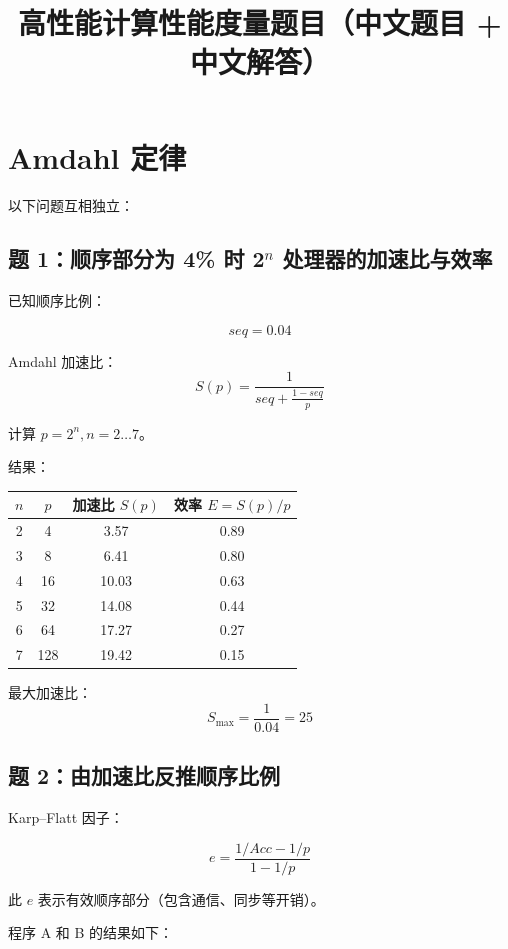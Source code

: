\documentclass[12pt]{article}
\title{高性能计算性能度量题目（中文题目 + 中文解答）}
\author{}
\date{}
\begin{document}
\maketitle

\section{Amdahl 定律}

以下问题互相独立：

\subsection{题 1：顺序部分为 4\% 时 2$^n$ 处理器的加速比与效率}

已知顺序比例：

\[
seq = 0.04
\]

Amdahl 加速比：
\[
S(p) = \frac{1}{seq + \frac{1-seq}{p}}
\]

计算 $p = 2^n, n=2\dots 7$。

结果：

\begin{center}
\begin{tabular}{c|c|c|c}
$n$ & $p$ & 加速比 $S(p)$ & 效率 $E=S(p)/p$ \\ \hline
2 & 4 & 3.57 & 0.89 \\
3 & 8 & 6.41 & 0.80 \\
4 & 16 & 10.03 & 0.63 \\
5 & 32 & 14.08 & 0.44 \\
6 & 64 & 17.27 & 0.27 \\
7 & 128 & 19.42 & 0.15 \\
\end{tabular}
\end{center}

最大加速比：
\[
S_{\max} = \frac{1}{0.04} = 25
\]

\subsection{题 2：由加速比反推顺序比例}

Karp--Flatt 因子：

\[
e = \frac{1/Acc - 1/p}{1 - 1/p}
\]

此 $e$ 表示有效顺序部分（包含通信、同步等开销）。

程序 A 和 B 的结果如下：
\end{document}
